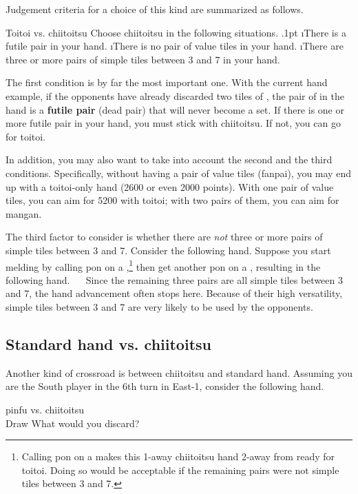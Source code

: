 \bigskip
\noindent Judgement criteria for a choice of this kind are summarized as follows.
\bigskip
\begin{itembox}[c]{{\jap Toitoi} vs. {\jap chiitoitsu}}
Choose {\jap chiitoitsu} in the following situations.
\be\itemsep.1pt
\i There is a futile pair in your hand.
\i There is no pair of value tiles in your hand.
\i There are three or more pairs of simple tiles between 3 and 7 in your hand.
\ee
\end{itembox}

\bigskip
\noindent The first condition is by far the most important one. With the current hand example, if the opponents have already discarded two tiles of {\large{}}, the pair of {\large{}} in the hand is a {\bf futile pair} (dead pair) that will never become a set. If there is one or more futile pair in your hand, you must stick with {\jap chiitoitsu}. If not, you can go for {\jap toitoi}. 

\bigskip
In addition, you may also want to take into account the second and the third conditions. Specifically, without having a pair of value tiles ({\jap fanpai}), you may end up with a {\jap toitoi}-only hand (2600 or even 2000 points). With one pair of value tiles, you can aim for 5200 with {\jap toitoi}; with two pairs of them, you can aim for {\jap mangan}. 

\bigskip
The third factor to consider is whether there are \emph{not} three or more pairs of simple tiles between 3 and 7. Consider the following hand. 
\bp
{}\bai\bai\fa\zhong
\ep
Suppose you start melding by calling {\jap pon} on a {\large\bai},\footnote{Calling {\jap pon} on a {\bai} makes this 1-away {\jap chiitoitsu} hand 2-away from ready for {\jap toitoi}. Doing so would be acceptable if the remaining pairs were not simple tiles between 3 and 7.} then get another {\jap pon} on a {\large{}}, resulting in the following hand.
\bp
{}\zhong~~\bai\rbai\bai
\ep
Since the remaining three pairs are all simple tiles between 3 and 7, the hand advancement often stops here. Because of their high versatility, simple tiles between 3 and 7 are very likely to be used by the opponents. 

\newpage
\subsection{Standard hand vs. {\jap chiitoitsu}}
Another kind of crossroad is between {\jap chiitoitsu} and standard hand. Assuming you are the South player in the 6th turn in East-1, consider the following hand. 
\bigskip
\begin{itembox}[r]{{\jap pinfu} vs. {\jap chiitoitsu}}
\bp
{}\bei\bei~\\
\hspace{290pt}\footnotesize{Draw}
\ep
\vspace{-17pt}What would you discard? \vspace{-5pt}
\end{itembox}

